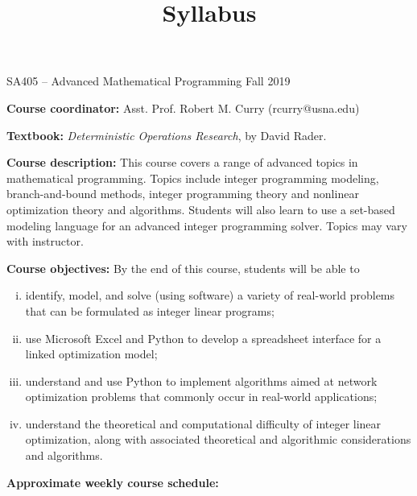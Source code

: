 \documentclass[12pt]{article}
\makeatletter
\theoremstyle{definition}
\newcommand{\graphbox}[5]%
{
\begin{tikzpicture}
     [>=latex,scale=#5]
     
     \draw [->,very thick] (#1, 0) -- (#2, 0) node[right] {$x$};
     \draw [->,very thick] (0, #3) -- (0, #4) node[above] {$y$};
     
     \draw[step=1cm,thick,dotted] (#1,#3) grid (#2,#4);
   \end{tikzpicture}
   }
\renewcommand{\maketitle}{
  \noindent SA405 -- Advanced Mathematical Programming \hfill Fall 2019

  \begin{center}\large{\textbf{\@title}}\end{center}
}
\makeatother
\begin{document}

\title{Syllabus}


\maketitle

\noindent \textbf{Course coordinator:}  Asst. Prof. Robert M. Curry  (rcurry@usna.edu)

\noindent \textbf{Textbook:}  \emph{Deterministic Operations Research}, by David Rader.

\noindent \textbf{Course description: } This course covers a range of advanced topics in mathematical programming. Topics include integer programming modeling, branch-and-bound methods, integer programming theory and nonlinear optimization theory and algorithms. Students will also learn to use a set-based modeling language for an advanced integer programming solver. Topics may vary with instructor.

\noindent \textbf{Course objectives:}  By the end of this course, students will be able to
\vspace{-2mm}
\begin{enumerate}[(i)]
\item identify, model, and solve (using software) a variety of real-world problems that can be formulated as integer linear programs;
\item use Microsoft Excel and Python to develop a spreadsheet interface for a linked optimization model;
\item understand and use Python to implement algorithms aimed at network optimization problems that commonly occur in real-world applications;
\item understand the theoretical and computational difficulty of integer linear optimization, along with associated theoretical and algorithmic considerations and algorithms.
\end{enumerate}
\noindent \textbf{Approximate weekly course schedule:} 
\end{document}
